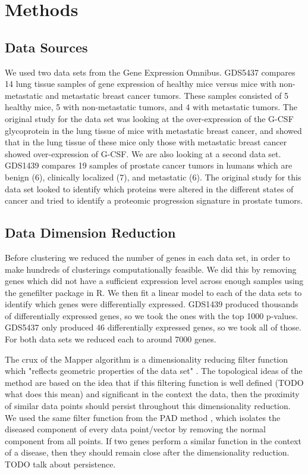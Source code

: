 \documentclass[preprint,10pt]{elsarticle}
\begin{document}
\section{Methods}
\subsection{Data Sources}
We used two data sets from the Gene Expression Omnibus. GDS5437 \cite{gds5437} compares 14 lung tissue samples of gene expression of healthy mice versus mice with non-metastatic and metastatic breast cancer tumors. These samples consisted of 5 healthy mice, 5 with non-metastatic tumors, and 4 with metastatic tumors. The original study for the data set was looking at the over-expression of the G-CSF glycoprotein in the lung tissue of mice with metastatic breast cancer, and showed that in the lung tissue of these mice only those with metastatic breast cancer showed over-expression of G-CSF. We are also looking at a second data set. GDS1439 \cite{gds1439} compares 19 samples of prostate cancer tumors in humans which are benign (6), clinically localized (7), and metastatic (6). The original study for this data set looked to identify which proteins were altered in the different states of cancer and tried to identify a proteomic progression signature in prostate tumors. 


\subsection{Data Dimension Reduction}
	Before clustering we reduced the number of genes in each data set, in order to make hundreds of clusterings computationally feasible. We did this by removing genes which did not have a sufficient expression level across enough samples using the genefilter package in R. We then fit a linear model to each of the data sets to identify which genes were differentially expressed. GDS1439 produced thousands of differentially expressed genes, so we took the ones with the top 1000 p-values. GDS5437 only produced 46 differentially expressed genes, so we took all of those. For both data sets we reduced each to around 7000 genes.
	
	The crux of the Mapper algorithm is a dimensionality reducing filter function which "reflects geometric properties of the data set" \cite{mapper}. The topological ideas of the method are based on the idea that if this filtering function is well defined (TODO what does this mean) and significant in the context the data, then the proximity of similar data points should persist throughout this dimensionality reduction. We used the same filter function from the PAD method \cite{nicolau}, which isolates the diseased component of every data point/vector by removing the normal component from all points. If two genes perform a similar function in the context of a disease, then they should remain close after the dimensionality reduction. TODO talk about persistence.
	
\end{document}

